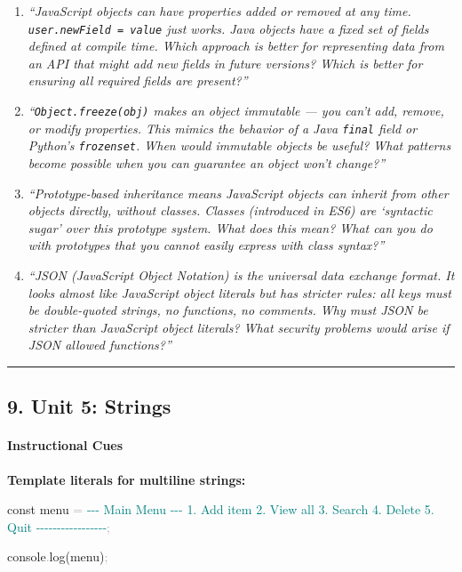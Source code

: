 \documentclass[
  justified,
  openright,
]{tufte-book}
\let\paragraph\paragraph
\newcommand{\BuiltInTok}[1]{#1}
\newcommand{\FunctionTok}[1]{\textcolor{BrandBlue}{#1}}
\newcommand{\KeywordTok}[1]{\textcolor{BrandBlue}{#1}}
\newcommand{\NormalTok}[1]{#1}
\newcommand{\OperatorTok}[1]{\textcolor{DarkGray}{#1}}
\newcommand{\VerbatimStringTok}[1]{\textcolor{Teal}{#1}}
\newenvironment{Shaded}{%
  \begin{snugshade}
}{%
  \end{snugshade}
}
\let\paragraph\paragraph
\begin{document}
\begin{enumerate}
\def\labelenumi{\arabic{enumi}.}
\item
  \emph{``JavaScript objects can have properties added or removed at any
  time.
  \texttt{user.newField\ =\ \textquotesingle{}value\textquotesingle{}}
  just works. Java objects have a fixed set of fields defined at compile
  time. Which approach is better for representing data from an API that
  might add new fields in future versions? Which is better for ensuring
  all required fields are present?''}
\item
  \emph{``\texttt{Object.freeze(obj)} makes an object immutable --- you
  can't add, remove, or modify properties. This mimics the behavior of a
  Java \texttt{final} field or Python's \texttt{frozenset}. When would
  immutable objects be useful? What patterns become possible when you
  can guarantee an object won't change?''}
\item
  \emph{``Prototype-based inheritance means JavaScript objects can
  inherit from other objects directly, without classes. Classes
  (introduced in ES6) are `syntactic sugar' over this prototype system.
  What does this mean? What can you do with prototypes that you cannot
  easily express with class syntax?''}
\item
  \emph{``JSON (JavaScript Object Notation) is the universal data
  exchange format. It looks almost like JavaScript object literals but
  has stricter rules: all keys must be double-quoted strings, no
  functions, no comments. Why must JSON be stricter than JavaScript
  object literals? What security problems would arise if JSON allowed
  functions?''}
\end{enumerate}

\begin{center}\rule{0.5\linewidth}{0.5pt}\end{center}

\subsection{9. Unit 5: Strings}\label{unit-5-strings}

\paragraph{Instructional Cues}\label{instructional-cues-6}

\textbf{Template literals for multiline strings:}

\begin{Shaded}
\begin{Highlighting}[]
\KeywordTok{const}\NormalTok{ menu }\OperatorTok{=} \VerbatimStringTok{\textasciigrave{}}
\VerbatimStringTok{{-}{-}{-} Main Menu {-}{-}{-}}
\VerbatimStringTok{1. Add item}
\VerbatimStringTok{2. View all}
\VerbatimStringTok{3. Search}
\VerbatimStringTok{4. Delete}
\VerbatimStringTok{5. Quit}
\VerbatimStringTok{{-}{-}{-}{-}{-}{-}{-}{-}{-}{-}{-}{-}{-}{-}{-}{-}{-}\textasciigrave{}}\OperatorTok{;}

\BuiltInTok{console}\OperatorTok{.}\FunctionTok{log}\NormalTok{(menu)}\OperatorTok{;}
\end{Highlighting}
\end{Shaded}
\end{document}
